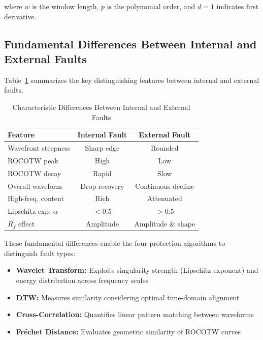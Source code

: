 \documentclass[journal]{IEEEtran}
\begin{document}
where $w$ is the window length, $p$ is the polynomial order, and $d=1$ indicates first derivative.

\subsection{Fundamental Differences Between Internal and External Faults}

Table~\ref{table:fault_differences_final} summarizes the key distinguishing features between internal and external faults.

\begin{table}[!t]
\centering
\caption{Characteristic Differences Between Internal and External Faults}
\label{table:fault_differences_final}
\renewcommand{\arraystretch}{1.3}
\begin{tabular}{|l|c|c|}
\hline
\textbf{Feature} & \textbf{Internal Fault} & \textbf{External Fault} \\
\hline
\hline
Wavefront steepness & Sharp edge & Rounded \\
\hline
ROCOTW peak & High & Low \\
\hline
ROCOTW decay & Rapid & Slow \\
\hline
Overall waveform & Drop-recovery & Continuous decline \\
\hline
High-freq. content & Rich & Attenuated \\
\hline
Lipschitz exp. $\alpha$ & $< 0.5$ & $> 0.5$ \\
\hline
$R_f$ effect & Amplitude & Amplitude \& shape \\
\hline
\end{tabular}
\end{table}

These fundamental differences enable the four protection algorithms to distinguish fault types:

\begin{itemize}
    \item \textbf{Wavelet Transform:} Exploits singularity strength (Lipschitz exponent) and energy distribution across frequency scales
    \item \textbf{DTW:} Measures similarity considering optimal time-domain alignment
    \item \textbf{Cross-Correlation:} Quantifies linear pattern matching between waveforms
    \item \textbf{Fréchet Distance:} Evaluates geometric similarity of ROCOTW curves
\end{itemize}
\end{document}

